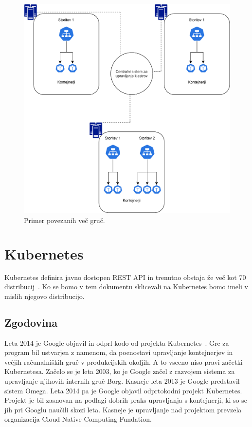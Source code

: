 \documentclass[a4paper, 12pt]{book}
\begin{document}
\begin{figure}[h]
\begin{center}
\includegraphics[width=1.0\textwidth]{images/primer-povezanih-gruc.pdf}
\end{center}
\caption{Primer povezanih več gruč.}
\label{problem-povezanih-gruc}
\end{figure}

\chapter{Kubernetes}
\label{Kubernetes}
Kubernetes definira javno dostopen REST API in trenutno obstaja že več kot 70 distribucij~\cite{cncf}.
Ko se bomo v tem dokumentu sklicevali na Kubernetes bomo imeli v mislih njegovo distribucijo.
\section{Zgodovina}
Leta 2014 je Google objavil in odprl kodo od projekta Kubernetes~\cite{what-is-Kubernetes}.
Gre za program bil ustvarjen z namenom, da poenostavi upravljanje kontejnerjev in večjih računalniških gruč v produkcijskih okoljih.
A to vseeno niso pravi začetki Kubernetesa.
Začelo se je leta 2003, ko je Google začel z razvojem sistema za upravljanje njihovih internih gruč Borg.
Kasneje leta 2013 je Google predstavil sistem Omega.
Leta 2014 pa je Google objavil odprtokodni projekt Kubernetes. 
Projekt je bil zasnovan na podlagi dobrih praks upravljanja s kontejnerji, ki so se jih pri Googlu naučili skozi leta.
Kasneje je upravljanje nad projektom prevzela organizacija Cloud Native Computing Fundation.
\end{document}

